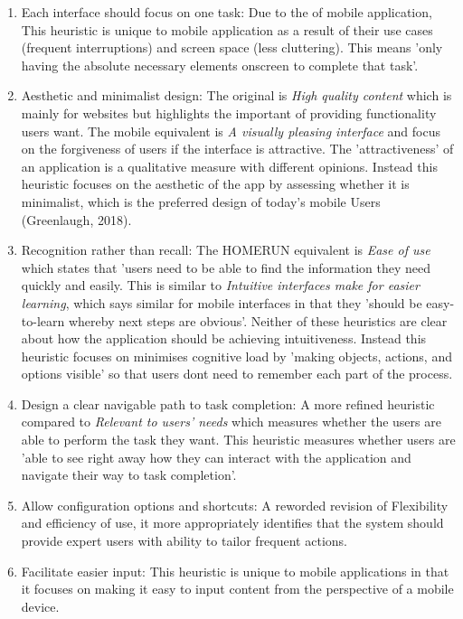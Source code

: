 \documentclass[a4 paper, 12pt]{article}
\begin{document}
\begin{enumerate}
            \item \textcolor{mygreen}{Each interface should focus on one task:} Due to the  of mobile application, This heuristic is unique to mobile application as a result of their use cases (frequent interruptions) and screen space (less cluttering). This means 'only having the absolute necessary elements onscreen to complete that task'.            
            \item \textcolor{myblue}{Aesthetic and minimalist design:} The original is \textit{\textcolor{myorange}{High quality content}} which is mainly for websites but highlights the important of providing functionality users want. The mobile equivalent is \textit{\textcolor{mygreen}{A visually pleasing interface}} and focus on the forgiveness of users if the interface is attractive. The 'attractiveness' of an application is a qualitative measure with different opinions. Instead this heuristic focuses on the aesthetic of the app by assessing whether it is minimalist, which is the preferred design of today's mobile Users (Greenlaugh, 2018).       
            \item \textcolor{myblue}{Recognition rather than recall:} The HOMERUN equivalent is \textit{\textcolor{myorange}{Ease of use}} which states that 'users need to be able to find the information they need quickly and easily. This is similar to \textit{\textcolor{mygreen}{Intuitive interfaces make for easier learning}}, which says similar for mobile interfaces in that they 'should be easy-to-learn whereby next steps are obvious'. Neither of these heuristics are clear about how the application should be achieving intuitiveness. Instead this heuristic focuses on minimises cognitive load by 'making objects, actions, and options visible' so that users dont need to remember each part of the process.
            \item \textcolor{mygreen}{Design a clear navigable path to task completion:} A more refined heuristic compared to \textit{\textcolor{myorange}{Relevant to users’ needs}} which measures whether the users are able to perform the task they want. This heuristic measures whether users are 'able to see right away how they can interact with the application and navigate their way to task completion'.     
            \item \textcolor{mygreen}{Allow configuration options and shortcuts:} A reworded revision of \textcolor{myblue}{Flexibility and efficiency of use}, it more appropriately identifies that the system should provide expert users with ability to tailor frequent actions. 
            \item \textcolor{mygreen}{Facilitate easier input:} This heuristic is unique to mobile applications in that it focuses on making it easy to input content from the perspective of a mobile device. 
        \end{enumerate}
\end{document}
